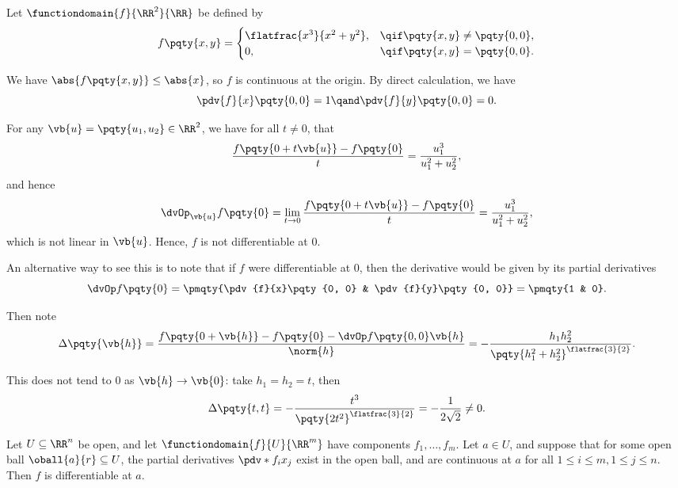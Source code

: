 \begin{example}
    Let \(\functiondomain{f}{\RR^2}{\RR}\) be defined by
    \[
        f\pqty{x, y} = \begin{cases}
            \flatfrac{x^3}{x^2 + y^2}, &\qif \pqty{x, y} \neq \pqty{0, 0}, \\
            0, &\qif \pqty{x, y} = \pqty{0, 0}.
        \end{cases}
    \]

    We have \(\abs{f\pqty{x, y}} \leq \abs{x}\), so \(f\) is continuous at the origin. By direct calculation, we have
    \[
        \pdv{f}{x} \pqty{0, 0} = 1 \qand \pdv{f}{y} \pqty{0, 0} = 0.
    \]

    For any \(\vb{u} = \pqty{u_1, u_2} \in \RR^2\), we have for all \(t \neq 0\), that
    \[
        \frac{f\pqty{0 + t \vb{u}} - f\pqty{0}}{t} = \frac{u_1^3}{u_1^2 + u_2^2},
    \]
    and hence
    \[
        \dvOp_{\vb{u}} f\pqty{0} = \lim_{t \to 0} \frac{f\pqty{0 + t \vb{u}} - f\pqty{0}}{t} = \frac{u_1^3}{u_1^2 + u_2^2},
    \]
    which is not linear in \(\vb{u}\). Hence, \(f\) is not differentiable at \(0\).

    An alternative way to see this is to note that if \(f\) were differentiable at \(0\), then the derivative would be given by its partial derivatives
    \[
        \dvOp f\pqty{0} = \pmqty{\pdv{f}{x}\pqty{0, 0} & \pdv{f}{y}\pqty{0, 0}} = \pmqty{1 & 0}.
    \]
    
    Then note
    \[
        \Delta\pqty{\vb{h}} = \frac{f\pqty{0 + \vb{h}} - f\pqty{0} - \dvOp f\pqty{0, 0} \vb{h}}{\norm{h}} = - \frac{h_1 h_2^2}{\pqty{h_1^2 + h_2^2}^{\flatfrac{3}{2}}}.
    \]

    This does not tend to \(0\) as \(\vb{h} \to \vb{0}\): take \(h_1 = h_2 = t\), then
    \[
        \Delta\pqty{t, t} = - \frac{t^3}{\pqty{2t^2}^{\flatfrac{3}{2}}} = - \frac{1}{2\sqrt{2}} \neq 0.
    \]
\end{example}

\begin{theorem}
    Let \(U \subseteq \RR^n\) be open, and let \(\functiondomain{f}{U}{\RR^m}\) have components \(f_1, \dots, f_m\). Let \(a \in U\), and suppose that for some open ball \(\oball{a}{r} \subseteq U\), the partial derivatives \(\pdv*{f_i}{x_j}\) exist in the open ball, and are continuous at \(a\) for all \(1 \leq i \leq m, 1 \leq j \leq n\). Then \(f\) is differentiable at \(a\).
\end{theorem}

